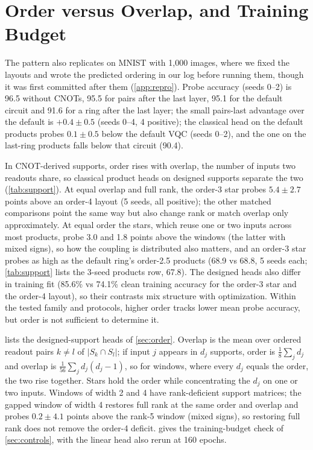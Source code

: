 \section{Order versus Overlap, and Training Budget}
\label{app:support}

The pattern also replicates on MNIST with 1,000 images, where we fixed the layouts and wrote the predicted ordering in our log before running them, though it was first committed after them (\cref{app:repro}). Probe accuracy (seeds 0--2) is 96.5 without CNOTs, 95.5
for pairs after the last layer, 95.1 for the default circuit and 91.6 for a ring after the
last layer; the small pairs-last advantage over the default is $+0.4\pm0.5$ (seeds 0--4, 4
positive); the classical head on the default products probes $0.1\pm0.5$ below the default
VQC (seeds 0--2), and the one on the last-ring products falls below that circuit (90.4).


In CNOT-derived supports, order rises with overlap, the number of inputs two readouts share, so
classical product heads on designed supports separate the two (\cref{tab:support}). At equal
overlap and full rank, the order-3 star probes $5.4\pm2.7$ points above an order-4 layout (5 seeds,
all positive); the other matched comparisons point the same way but also change rank or match
overlap only approximately. At equal order the stars, which reuse one or two inputs across most
products, probe 3.0 and 1.8 points above the windows (the latter with mixed signs), so how the coupling is distributed also
matters, and an order-3 star probes as high as the default ring's order-2.5 products (68.9 vs
68.8, 5 seeds each; \cref{tab:support} lists the 3-seed products row, 67.8). The designed heads also differ in training fit (85.6\% vs 74.1\% clean training accuracy
for the order-3 star and the order-4 layout), so their contrasts mix structure with
optimization. Within the tested family and protocols, higher order tracks lower mean probe
accuracy, but order is not sufficient to determine it.






 lists the designed-support heads of \cref{sec:order}. Overlap is the mean
over ordered readout pairs $k\neq l$ of $|S_k\cap S_l|$; if input $j$ appears in $d_j$ supports,
order is $\frac18\sum_j d_j$ and overlap is $\frac1{56}\sum_j d_j(d_j-1)$, so for windows,
where every $d_j$ equals the order, the two rise together. Stars hold the order while
concentrating the $d_j$ on one or two inputs. Windows of width 2 and 4 have rank-deficient
support matrices; the gapped window of width 4 restores full rank at the same order and
overlap and probes $0.2\pm4.1$ points above the rank-5 window (mixed signs), so restoring full
rank does not remove the order-4 deficit.  gives the training-budget check
of \cref{sec:controls}, with the linear head also rerun at 160 epochs.

